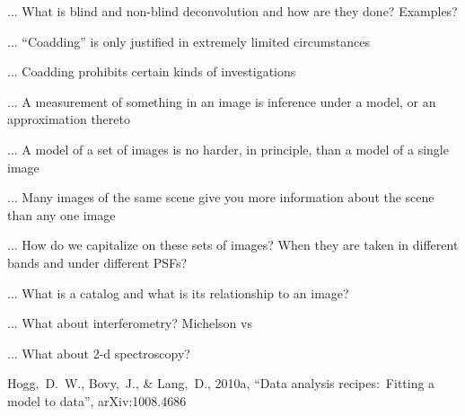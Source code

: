 \documentclass[12pt,twoside,pdftex]{article}
\begin{document}
... What is blind and non-blind deconvolution and how are they done?  Examples?
 
... ``Coadding'' is only justified in extremely limited circumstances

... Coadding prohibits certain kinds of investigations

... A measurement of something in an image is inference under a model, or an approximation thereto

... A model of a set of images is no harder, in principle, than a model of a single image

... Many images of the same scene give you more information about the scene than any one image

... How do we capitalize on these sets of images?  When they are taken in different bands and under different PSFs?

... What is a catalog and what is its relationship to an image?

... What about interferometry?  Michelson vs 

... What about 2-d spectroscopy?

\clearpage
{}\theendnotes

\clearpage
\begin{thebibliography}{}\raggedright
{}
  Hogg,~D.~W., Bovy,~J., \& Lang,~D., 2010a,
  ``Data analysis recipes:\ Fitting a model to data'', arXiv:1008.4686
\end{thebibliography}
\end{document}
